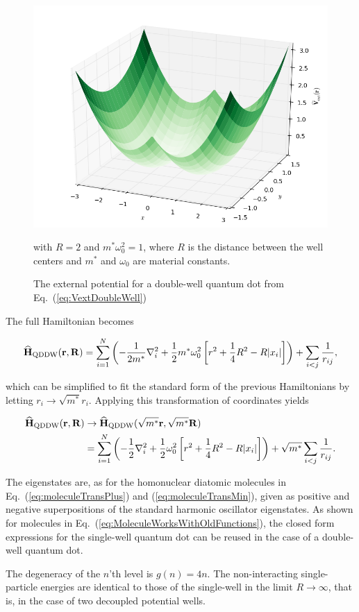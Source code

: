 \begin{figure}
 \begin{center}
  \includegraphics[scale=0.5]{../Graphics/Potentials/doubleWell.png}
  \caption{The external potential for a double-well quantum dot from Eq.~(\ref{eq:VextDoubleWell})} with $R=2$ and $m^\ast\omega_0^2 = 1$, where $R$ is the distance between the well centers and $m^\ast$ and $\omega_0$ are material constants.  
  \label{fig:extPotDoubleWell}
 \end{center}
\end{figure}

The full Hamiltonian becomes

\begin{equation}
  {\bf\widehat{H}}_{\mathrm{QDDW}}(\mathbf{r}, \mathbf{R}) = \sum_{i=1}^N \left(-\frac{1}{2m^\ast}\nabla_i^2 + \frac{1}{2}m^\ast \omega_0^2 \left[r^2 + \frac{1}{4}R^2 - R|x_i|\right]  \right) + \sum_{i<j} \frac{1}{r_{ij}},
\end{equation}

which can be simplified to fit the standard form of the previous Hamiltonians by letting $r_i\to\sqrt{m^\ast}r_i$. Applying this transformation of coordinates yields

\begin{align}
  {\bf\widehat{H}}_{\mathrm{QDDW}}(\mathbf{r}, \mathbf{R}) &\to {\bf\widehat{H}}_{\mathrm{QDDW}}(\sqrt{m^\ast}\mathbf{r}, \sqrt{m^\ast}\mathbf{R}) \\
   &=\sum_{i=1}^N \left(-\frac{1}{2}\nabla_i^2 + \frac{1}{2} \omega_0^2 \left[r^2 + \frac{1}{4}R^2 - R|x_i|\right]  \right) + \sqrt{m^\ast}\sum_{i<j} \frac{1}{r_{ij}}.
\end{align}

The eigenstates are, as for the homonuclear diatomic molecules in Eq.~(\ref{eq:moleculeTransPlus}) and (\ref{eq:moleculeTransMin}), given as positive and negative superpositions of the standard harmonic oscillator eigenstates. As shown for molecules in Eq.~(\ref{eq:MoleculeWorksWithOldFunctions}), the closed form expressions for the single-well quantum dot can be reused in the case of a double-well quantum dot. 

The degeneracy of the $n$'th level is $g(n) = 4n$. The non-interacting single-particle energies are identical to those of the single-well in the limit $R\to\infty$, that is, in the case of two decoupled potential wells.

